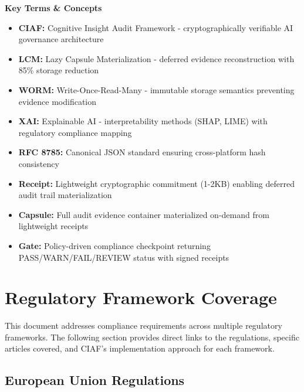 \documentclass[12pt,a4paper]{article}
\begin{document}
\begin{technicalbox}
\textbf{Key Terms \& Concepts}
\begin{itemize}
\item \textbf{CIAF:} Cognitive Insight Audit Framework - cryptographically verifiable AI governance architecture
\item \textbf{LCM:} Lazy Capsule Materialization - deferred evidence reconstruction with 85\% storage reduction
\item \textbf{WORM:} Write-Once-Read-Many - immutable storage semantics preventing evidence modification
\item \textbf{XAI:} Explainable AI - interpretability methods (SHAP, LIME) with regulatory compliance mapping
\item \textbf{RFC 8785:} Canonical JSON standard ensuring cross-platform hash consistency
\item \textbf{Receipt:} Lightweight cryptographic commitment (1-2KB) enabling deferred audit trail materialization
\item \textbf{Capsule:} Full audit evidence container materialized on-demand from lightweight receipts
\item \textbf{Gate:} Policy-driven compliance checkpoint returning PASS/WARN/FAIL/REVIEW status with signed receipts
\end{itemize}
\end{technicalbox}

\section{Regulatory Framework Coverage}

This document addresses compliance requirements across multiple regulatory frameworks. The following section provides direct links to the regulations, specific articles covered, and CIAF's implementation approach for each framework.

\subsection{European Union Regulations}
\end{document}
